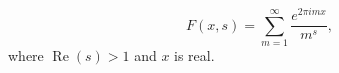 $$F(x, s) = \sum_{m=1}^{\infty} \frac{e^{2\pi i m x}}{m^s},$$
where $\operatorname{Re}(s) > 1$ and $x$ is real.
